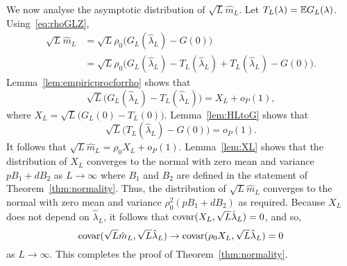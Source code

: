 \documentclass[journal]{IEEEtran}
\begin{document}
We now analyse the asymptotic distribution of $\sqrt{L} \hat{m}_L$.  Let $T_L(\lambda) = {\mathbb E} G_L(\lambda)$.  Using~\eqref{eq:rhoGLZ},
\begin{align*}
\sqrt{L} \hat{m}_L &= \sqrt{L} \rho_0 \big( G_L(\hat{\lambda}_L) - G(0) \big) \\
&= \sqrt{L} \rho_0 \big( G_L(\hat{\lambda}_L) - T_L(\hat{\lambda}_L) + T_L(\hat{\lambda}_L) - G(0) \big).
\end{align*}
Lemma~\ref{lem:empiricprocforrho} shows that 
\[
\sqrt{L}\big( G_L(\hat{\lambda}_L) - T_L(\hat{\lambda}_L)  \big) = X_L + o_P(1),
\]
where $X_L = \sqrt{L}\big( G_L(0) - T_L(0)  \big)$.  Lemma~\ref{lem:HLtoG} shows that
\[
\sqrt{L}\big( T_L(\hat{\lambda}_L) - G(0) \big) = o_P(1).
\]
It follows that $\sqrt{L} \hat{m}_L =  \rho_0 X_L + o_P(1)$.  Lemma~\ref{lem:XL} shows that the distribution of $X_L$ converges to the normal with zero mean and variance $p B_1 + d B_2$ as $L\rightarrow\infty$ where $B_1$ and $B_2$ are defined in the statement of Theorem~\ref{thm:normality}.  Thus, the distribution of $\sqrt{L} \hat{m}_L$ converges to the normal with zero mean and variance $\rho_0^2(p B_1 + d B_2)$ as required.  Because $X_L$ does not depend on $\hat{\lambda}_L$, it follows that $\operatorname{covar}(X_L, \sqrt{L}\hat{\lambda}_L) = 0$, and so,
\[
\operatorname{covar}(\sqrt{L}\hat{m}_L, \sqrt{L}\hat{\lambda}_L) \rightarrow \operatorname{covar}(\rho_0 X_L, \sqrt{L}\hat{\lambda}_L) = 0
\]
as $L \rightarrow \infty$.  This completes the proof of Theorem~\ref{thm:normality}.



\end{document}
